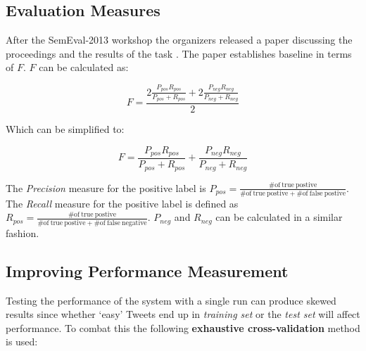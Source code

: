 \documentclass[final,3p,12pt]{elsarticle}
\begin{document}
\subsection{Evaluation Measures}
\label{ssection:evaluation}

After the SemEval-2013 workshop the organizers released a paper discussing the
proceedings and the results of the task \cite{Nakov2013}. The paper establishes
baseline in terms of $F$. $F$ can be calculated as:

\begin{equation}
    F = \frac{2 \frac{P_{pos}R_{pos}}{P_{pos} + R_{pos}} +
    2 \frac{P_{neg}R_{neg}}{P_{neg} + R_{neg}}}{2}
\end{equation}

Which can be simplified to:

\begin{equation}
    F = \frac{P_{pos}R_{pos}}{P_{pos} + R_{pos}} + \frac{P_{neg}R_{neg}}{P_{neg} + R_{neg}}
\end{equation}

The \textit{Precision} measure for the positive label is $P_{pos} =
\frac{\mathrm{\# of\ true\ postive}}{\mathrm{\# of\ true\ postive} + \mathrm{\#
of\ false\ postive} }$. The \textit{Recall} measure for the positive label is
defined as $R_{pos} = \frac{\mathrm{\# of\ true\ postive}}{\mathrm{\# of\ true\
postive} + \mathrm{\# of\ false\ negative} }$. $P_{neg}$ and $R_{neg}$ can be
calculated in a similar fashion.

\subsection{Improving Performance Measurement}
\label{ssection:performancemeasurement}

    Testing the performance of the system with a single run can produce skewed
    results since whether `easy' Tweets end up in \textit{training set} or the
    \textit{test set} will affect performance. To combat this the following
    \textbf{exhaustive cross-validation} method is used:
\end{document}
